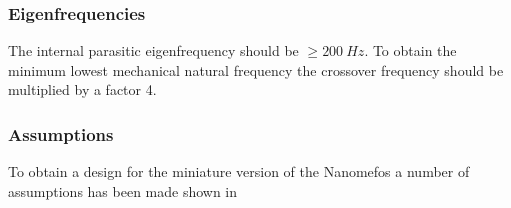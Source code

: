\subsubsection*{Eigenfrequencies}
The internal parasitic eigenfrequency should be $\geq 200\ Hz$. To obtain the minimum lowest mechanical natural frequency the crossover frequency should be multiplied by a factor 4.

\subsubsection*{Assumptions}
To obtain a design for the miniature version of the Nanomefos a number of assumptions has been made shown in 




